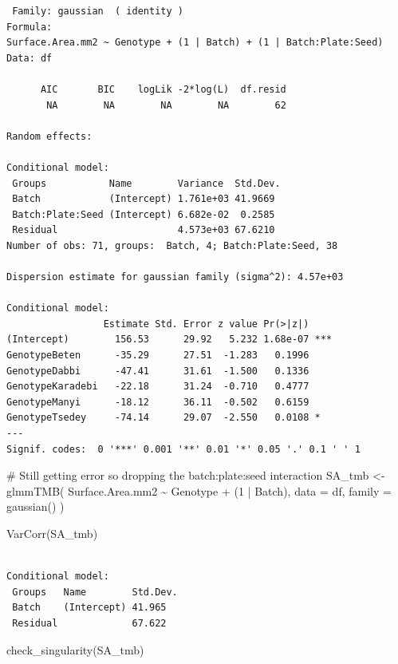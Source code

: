 \documentclass[
  letterpaper,
  DIV=11,
  numbers=noendperiod]{scrartcl}
\newenvironment{Shaded}{\begin{snugshade}}{\end{snugshade}}
\newcommand{\AttributeTok}[1]{\textcolor[rgb]{0.40,0.45,0.13}{#1}}
\newcommand{\CommentTok}[1]{\textcolor[rgb]{0.37,0.37,0.37}{#1}}
\newcommand{\DecValTok}[1]{\textcolor[rgb]{0.68,0.00,0.00}{#1}}
\newcommand{\FunctionTok}[1]{\textcolor[rgb]{0.28,0.35,0.67}{#1}}
\newcommand{\NormalTok}[1]{\textcolor[rgb]{0.00,0.23,0.31}{#1}}
\newcommand{\OtherTok}[1]{\textcolor[rgb]{0.00,0.23,0.31}{#1}}
\newcommand{\SpecialCharTok}[1]{\textcolor[rgb]{0.37,0.37,0.37}{#1}}
\begin{document}
\begin{verbatim}
 Family: gaussian  ( identity )
Formula:          
Surface.Area.mm2 ~ Genotype + (1 | Batch) + (1 | Batch:Plate:Seed)
Data: df

      AIC       BIC    logLik -2*log(L)  df.resid 
       NA        NA        NA        NA        62 

Random effects:

Conditional model:
 Groups           Name        Variance  Std.Dev.
 Batch            (Intercept) 1.761e+03 41.9669 
 Batch:Plate:Seed (Intercept) 6.682e-02  0.2585 
 Residual                     4.573e+03 67.6210 
Number of obs: 71, groups:  Batch, 4; Batch:Plate:Seed, 38

Dispersion estimate for gaussian family (sigma^2): 4.57e+03 

Conditional model:
                 Estimate Std. Error z value Pr(>|z|)    
(Intercept)        156.53      29.92   5.232 1.68e-07 ***
GenotypeBeten      -35.29      27.51  -1.283   0.1996    
GenotypeDabbi      -47.41      31.61  -1.500   0.1336    
GenotypeKaradebi   -22.18      31.24  -0.710   0.4777    
GenotypeManyi      -18.12      36.11  -0.502   0.6159    
GenotypeTsedey     -74.14      29.07  -2.550   0.0108 *  
---
Signif. codes:  0 '***' 0.001 '**' 0.01 '*' 0.05 '.' 0.1 ' ' 1
\end{verbatim}

\begin{Shaded}
\begin{Highlighting}[]
\CommentTok{\# Still getting error so dropping the batch:plate:seed interaction}
\NormalTok{SA\_tmb }\OtherTok{\textless{}{-}} \FunctionTok{glmmTMB}\NormalTok{(}
\NormalTok{  Surface.Area.mm2 }\SpecialCharTok{\textasciitilde{}}\NormalTok{ Genotype }\SpecialCharTok{+}\NormalTok{ (}\DecValTok{1} \SpecialCharTok{|}\NormalTok{ Batch),}
  \AttributeTok{data =}\NormalTok{ df, }\AttributeTok{family =} \FunctionTok{gaussian}\NormalTok{()}
\NormalTok{)}

\FunctionTok{VarCorr}\NormalTok{(SA\_tmb)}
\end{Highlighting}
\end{Shaded}

\begin{verbatim}

Conditional model:
 Groups   Name        Std.Dev.
 Batch    (Intercept) 41.965  
 Residual             67.622  
\end{verbatim}

\begin{Shaded}
\begin{Highlighting}[]
\FunctionTok{check\_singularity}\NormalTok{(SA\_tmb)}
\end{Highlighting}
\end{Shaded}
\end{document}
